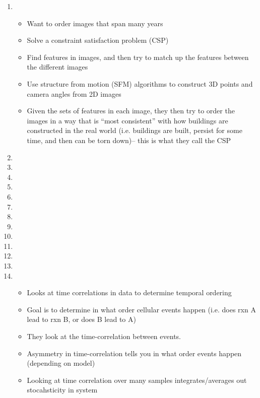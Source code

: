 \documentclass[12pt]{article}
\begin{document}
\begin{enumerate}
\item {}
\begin{itemize}
	\item Want to order images that span many years
	\item Solve a constraint satisfaction problem (CSP)
	\item Find features in images, and then try to match up the features between the different images
	\item Use structure from motion (SFM) algorithms to construct 3D points and camera angles from 2D images
	\item Given the sets of features in each image, they then try to order the images in a way that is ``most consistent'' with how buildings are constructed in the real world (i.e. buildings are built, persist for some time, and then can be torn down)-- this is what they call the CSP
\end{itemize}
\item {}

\item {}

\item {}

\item {}

\item {}

\item {}

\item {}

\item {}

\item {}
  
\item {}

\item {}

\item {}

\item {}
\begin{itemize}
	\item Looks at time correlations in data to determine temporal ordering
	\item Goal is to determine in what order cellular events happen (i.e. does rxn A lead to rxn B, or does B lead to A)
	\item They look at the time-correlation between events.
	\item Asymmetry in time-correlation tells you in what order events happen (depending on model)
	\item Looking at time correlation over many samples integrates/averages out stocahsticity in system
\end{itemize}


\end{enumerate}
\end{document}
